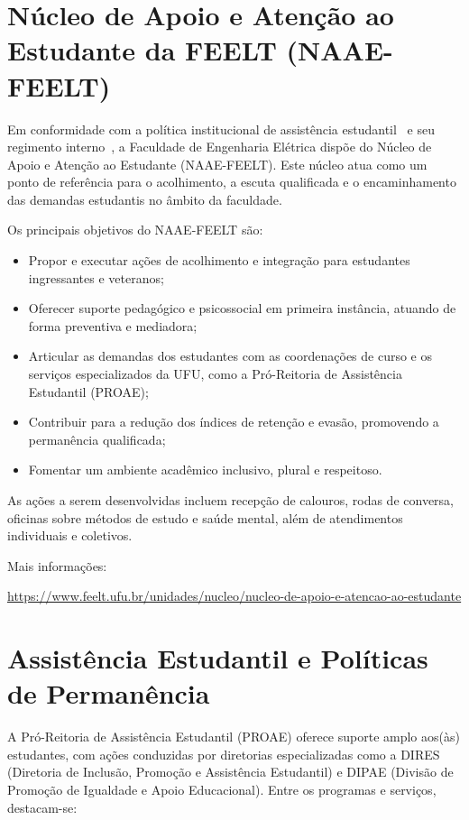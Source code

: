 \section{Núcleo de Apoio e Atenção ao Estudante da FEELT (NAAE-FEELT)}

Em conformidade com a política institucional de assistência estudantil~\cite{ufu_consex_20_2022} e seu regimento interno~\cite{ufu_feelt_regimento_2023}, a Faculdade de Engenharia Elétrica dispõe do Núcleo de Apoio e Atenção ao Estudante (NAAE-FEELT). Este núcleo atua como um ponto de referência para o acolhimento, a escuta qualificada e o encaminhamento das demandas estudantis no âmbito da faculdade.

Os principais objetivos do NAAE-FEELT são:
\begin{itemize}
\item Propor e executar ações de acolhimento e integração para estudantes ingressantes e veteranos;
\item Oferecer suporte pedagógico e psicossocial em primeira instância, atuando de forma preventiva e mediadora;
\item Articular as demandas dos estudantes com as coordenações de curso e os serviços especializados da UFU, como a Pró-Reitoria de Assistência Estudantil (PROAE);
\item Contribuir para a redução dos índices de retenção e evasão, promovendo a permanência qualificada;
\item Fomentar um ambiente acadêmico inclusivo, plural e respeitoso.
\end{itemize}

As ações a serem desenvolvidas incluem recepção de calouros, rodas de conversa, oficinas sobre métodos de estudo e saúde mental, além de atendimentos individuais e coletivos.

Mais informações:

{\footnotesize\url{https://www.feelt.ufu.br/unidades/nucleo/nucleo-de-apoio-e-atencao-ao-estudante}}

\section{Assistência Estudantil e Políticas de Permanência}

A Pró-Reitoria de Assistência Estudantil (PROAE) oferece suporte amplo aos(às) estudantes, com ações conduzidas por diretorias especializadas como a DIRES (Diretoria de Inclusão, Promoção e Assistência Estudantil) e DIPAE (Divisão de Promoção de Igualdade e Apoio Educacional). Entre os programas e serviços, destacam-se:

